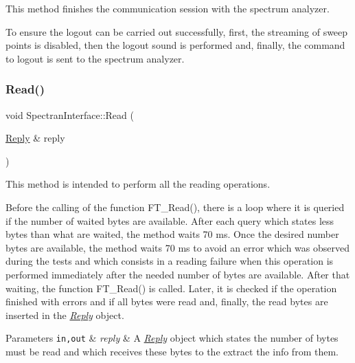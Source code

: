 This method finishes the communication session with the spectrum analyzer. 

To ensure the logout can be carried out successfully, first, the streaming of sweep points is disabled, then the logout sound is performed and, finally, the command to logout is sent to the spectrum analyzer. \mbox{\label{classSpectranInterface_a63c61d4d26c5aa335c6a20f469f3ec00}} 
\subsubsection{\texorpdfstring{Read()}{Read()}}
{\footnotesize\ttfamily void Spectran\+Interface\+::\+Read (\begin{DoxyParamCaption}\item[{\hyperlink{classReply}{Reply} \&}]{reply }\end{DoxyParamCaption})\hspace{0.3cm}{\ttfamily [inline]}}



This method is intended to perform all the reading operations. 

Before the calling of the function {\ttfamily F\+T\+\_\+\+Read()}, there is a loop where it is queried if the number of waited bytes are available. After each query which states less bytes than what are waited, the method waits 70 ms. Once the desired number bytes are available, the method waits 70 ms to avoid an error which was observed during the tests and which consists in a reading failure when this operation is performed immediately after the needed number of bytes are available. After that waiting, the function {\ttfamily F\+T\+\_\+\+Read()} is called. Later, it is checked if the operation finished with errors and if all bytes were read and, finally, the read bytes are inserted in the {\itshape \hyperlink{classReply}{Reply}} object. 
\begin{DoxyParams}[1]{Parameters}
\mbox{\tt in,out}  & {\em reply} & A {\itshape \hyperlink{classReply}{Reply}} object which states the number of bytes must be read and which receives these bytes to the extract the info from them. \\
\hline
\end{DoxyParams}
\mbox{\label{classSpectranInterface_a512218c4f1589c32b4fd9a0f7ad5e8cc}} 
